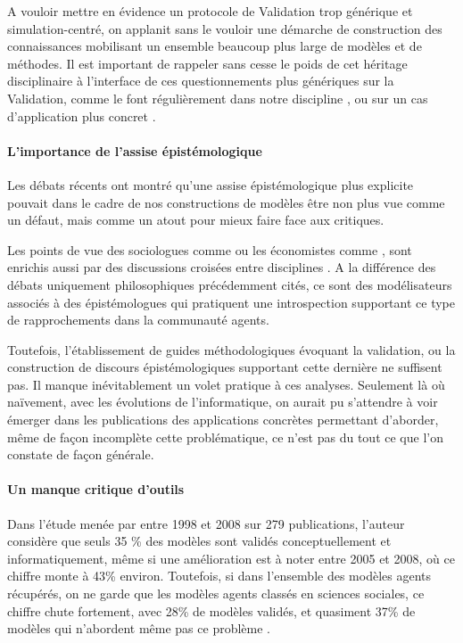 A vouloir mettre en évidence un protocole de Validation trop générique et simulation-centré, on applanit sans le vouloir une démarche de construction des connaissances mobilisant un ensemble beaucoup plus large de modèles et de méthodes. Il est important de rappeler sans cesse le poids de cet héritage disciplinaire à l'interface de ces questionnements plus génériques sur la Validation, comme le font régulièrement dans notre discipline \textcites{Besse2000, Sanders2000, Mathian2014}, ou sur un cas d'application plus concret \textcites{Cottineau2014a, Cottineau2014b}.

\paragraph{L'importance de l'assise épistémologique}

Les débats récents ont montré qu'une assise épistémologique plus explicite pouvait dans le cadre de nos constructions de modèles être non plus vue comme un défaut, mais comme un atout pour mieux faire face aux critiques.

Les points de vue des sociologues comme \autocites{Hedstrom2010, Elsenbroich2012, Squazzoni2010, Manzo2007, Gilbert2009, Conte2001} ou les économistes comme \autocite{Epstein1996, Phan2010}, sont enrichis aussi par des discussions croisées entre disciplines \autocites{Gilbert1995a,Amblard2006, Phan2010a, Livet2014, Varenne2013,Conte2012}. A la différence des débats uniquement philosophiques précédemment cités, ce sont des modélisateurs associés à des épistémologues qui pratiquent une introspection supportant ce type de rapprochements dans la communauté agents.

Toutefois, l'établissement de guides méthodologiques évoquant la validation, ou la construction de discours épistémologiques supportant cette dernière ne suffisent pas. Il manque inévitablement un volet pratique à ces analyses. Seulement là où naïvement, avec les évolutions de l'informatique, on aurait pu s'attendre à voir émerger dans les publications des applications concrètes permettant d'aborder, même de façon incomplète cette problématique, ce n'est pas du tout ce que l'on constate de façon générale.

\paragraph{Un manque critique d'outils}

Dans l'étude menée par \textcite{Heath2009} entre 1998 et 2008 sur 279 publications, l'auteur considère que seuls 35 \% des modèles sont validés conceptuellement et informatiquement, même si une amélioration est à noter entre 2005 et 2008, où ce chiffre monte à 43\% environ. Toutefois, si dans l'ensemble des modèles agents récupérés, on ne garde que les modèles agents classés en sciences sociales, ce chiffre chute fortement, avec 28\% de modèles validés, et quasiment 37\% de modèles qui n'abordent même pas ce problème .


